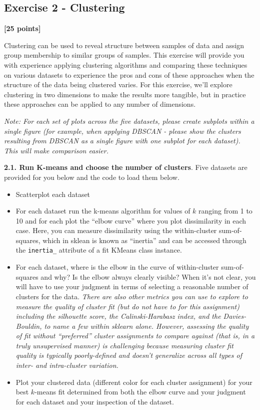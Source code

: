 \documentclass[
  letterpaper,
  DIV=11,
  numbers=noendperiod]{scrartcl}
\providecommand{\tightlist}{%
  \setlength{\itemsep}{0pt}\setlength{\parskip}{0pt}}\usepackage{longtable,booktabs,array}
\begin{document}
\subsection{Exercise 2 - Clustering}\label{exercise-2---clustering}

\textbf{{[}25 points{]}}

Clustering can be used to reveal structure between samples of data and
assign group membership to similar groups of samples. This exercise will
provide you with experience applying clustering algorithms and comparing
these techniques on various datasets to experience the pros and cons of
these approaches when the structure of the data being clustered varies.
For this exercise, we'll explore clustering in two dimensions to make
the results more tangible, but in practice these approaches can be
applied to any number of dimensions.

\emph{Note: For each set of plots across the five datasets, please
create subplots within a single figure (for example, when applying
DBSCAN - please show the clusters resulting from DBSCAN as a single
figure with one subplot for each dataset). This will make comparison
easier.}

\textbf{2.1. Run K-means and choose the number of clusters}. Five
datasets are provided for you below and the code to load them below.

\begin{itemize}
\tightlist
\item
  Scatterplot each dataset
\item
  For each dataset run the k-means algorithm for values of \(k\) ranging
  from 1 to 10 and for each plot the ``elbow curve'' where you plot
  dissimilarity in each case. Here, you can measure dissimilarity using
  the within-cluster sum-of-squares, which in sklean is known as
  ``inertia'' and can be accessed through the \texttt{inertia\_}
  attribute of a fit KMeans class instance.
\item
  For each dataset, where is the elbow in the curve of within-cluster
  sum-of-squares and why? Is the elbow always clearly visible? When it's
  not clear, you will have to use your judgment in terms of selecting a
  reasonable number of clusters for the data. \emph{There are also other
  metrics you can use to explore to measure the quality of cluster fit
  (but do not have to for this assignment) including the silhouette
  score, the Calinski-Harabasz index, and the Davies-Bouldin, to name a
  few within sklearn alone. However, assessing the quality of fit
  without ``preferred'' cluster assignments to compare against (that is,
  in a truly unsupervised manner) is challenging because measuring
  cluster fit quality is typically poorly-defined and doesn't generalize
  across all types of inter- and intra-cluster variation.}
\item
  Plot your clustered data (different color for each cluster assignment)
  for your best \(k\)-means fit determined from both the elbow curve and
  your judgment for each dataset and your inspection of the dataset.
\end{itemize}
\end{document}
